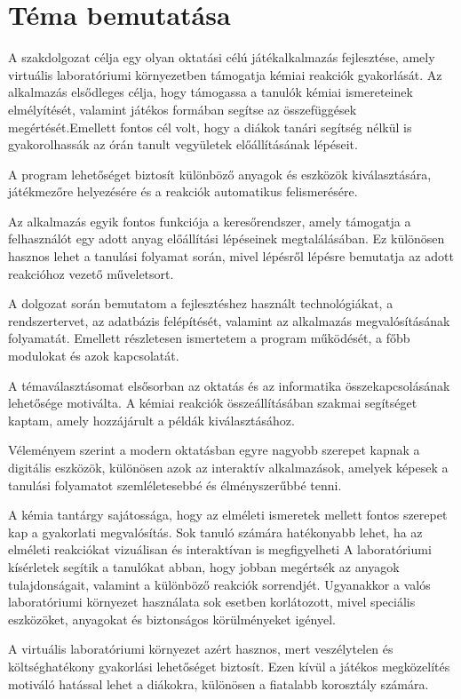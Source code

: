 \documentclass[]{thesis-ekf}
\begin{document}
	\section{Téma bemutatása}
	
	A szakdolgozat célja egy olyan oktatási célú játékalkalmazás fejlesztése, amely virtuális laboratóriumi	környezetben támogatja kémiai reakciók gyakorlását.
	Az alkalmazás elsődleges célja, hogy támogassa a tanulók kémiai ismereteinek elmélyítését, valamint játékos formában segítse az összefüggések megértését.Emellett fontos cél volt, hogy a diákok tanári segítség nélkül is gyakorolhassák az órán tanult vegyületek előállításának lépéseit.
	
	A program lehetőséget biztosít különböző anyagok és eszközök kiválasztására, játékmezőre helyezésére	és a reakciók automatikus felismerésére.
	
	Az alkalmazás egyik fontos funkciója a keresőrendszer, amely támogatja a felhasználót egy adott anyag	előállítási lépéseinek megtalálásában. Ez különösen hasznos lehet a tanulási folyamat során, mivel lépésről lépésre bemutatja az adott reakcióhoz vezető műveletsort.
	
	A dolgozat során bemutatom a fejlesztéshez használt technológiákat, a rendszertervet, az adatbázis felépítését, valamint az alkalmazás megvalósításának folyamatát. Emellett részletesen ismertetem a program működését, a főbb modulokat és azok kapcsolatát.
	
	A témaválasztásomat elsősorban az oktatás és az informatika összekapcsolásának lehetősége motiválta. A kémiai reakciók összeállításában szakmai segítséget kaptam, amely hozzájárult a példák kiválasztásához.
	
	Véleményem szerint a modern oktatásban egyre nagyobb szerepet kapnak a digitális eszközök, különösen azok az interaktív alkalmazások, amelyek képesek a tanulási folyamatot szemléletesebbé és élményszerűbbé tenni.
	
	A kémia tantárgy sajátossága, hogy az elméleti ismeretek mellett fontos szerepet kap a gyakorlati megvalósítás. Sok tanuló számára hatékonyabb lehet, ha az elméleti reakciókat vizuálisan és interaktívan is megfigyelheti A laboratóriumi kísérletek segítik a tanulókat abban, hogy jobban megértsék az anyagok tulajdonságait, valamint a különböző reakciók sorrendjét. Ugyanakkor a valós laboratóriumi környezet használata sok esetben korlátozott, mivel speciális eszközöket, anyagokat és biztonságos körülményeket igényel.
	
	A virtuális laboratóriumi környezet azért hasznos, mert veszélytelen és költséghatékony gyakorlási lehetőséget biztosít. Ezen kívül a játékos megközelítés motiváló hatással lehet a diákokra, különösen a fiatalabb korosztály számára.
	
\end{document}
